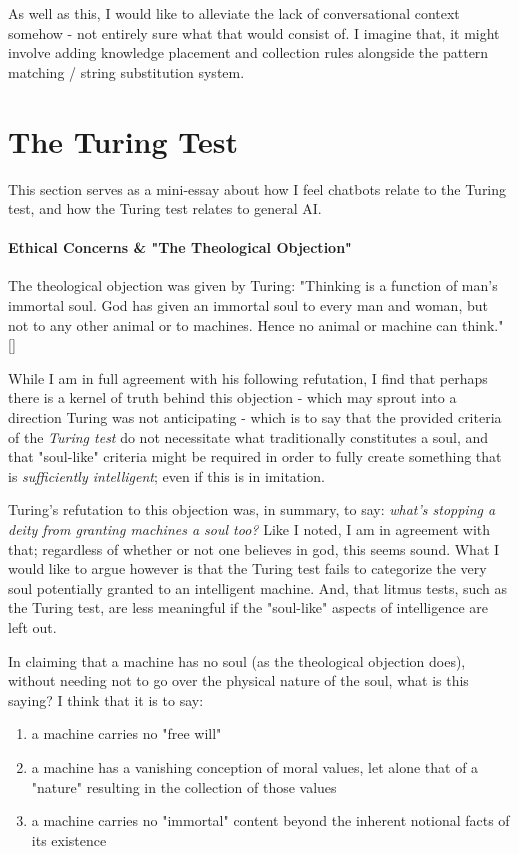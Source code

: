 \documentclass[]{article}
\begin{document}
As well as this, I would like to alleviate the lack of conversational context somehow - not entirely sure what that would consist of. I imagine that, it might involve adding knowledge placement and collection rules alongside the pattern matching / string substitution system.

\section{The Turing Test}\label{sec:discussion}

This section serves as a mini-essay about how I feel chatbots relate to the Turing test, and how the Turing test relates to general AI.

\paragraph{Ethical Concerns \& "The Theological Objection"} The theological objection was given by Turing: "Thinking is a function of man's immortal soul. God has given an immortal soul to every man and woman, but not to any other animal or to machines. Hence no animal or machine can think." []

While I am in full agreement with his following refutation, I find that perhaps there is a kernel of truth behind this objection - which may sprout into a direction Turing was not anticipating - which is to say that the provided criteria of the \emph{Turing test} do not necessitate what traditionally constitutes a soul, and that "soul-like" criteria might be required in order to fully create something that is \emph{sufficiently intelligent}; even if this is in imitation.

Turing's refutation to this objection was, in summary, to say: \emph{what's stopping a deity from granting machines a soul too?} Like I noted, I am in agreement with that; regardless of whether or not one believes in god, this seems sound. What I would like to argue however is that the Turing test fails to categorize the very soul potentially granted to an intelligent machine. And, that litmus tests, such as the Turing test, are less meaningful if the "soul-like" aspects of intelligence are left out.

In claiming that a machine has no soul (as the theological objection does), without needing not to go over the physical nature of the soul, what is this saying? I think that it is to say:
\begin{enumerate}
	\item a machine carries no "free will"
	\item a machine has a vanishing conception of moral values, let alone that of a "nature" resulting in the collection of those values
	\item a machine carries no "immortal" content beyond the inherent notional facts of its existence
\end{enumerate}
\end{document}
